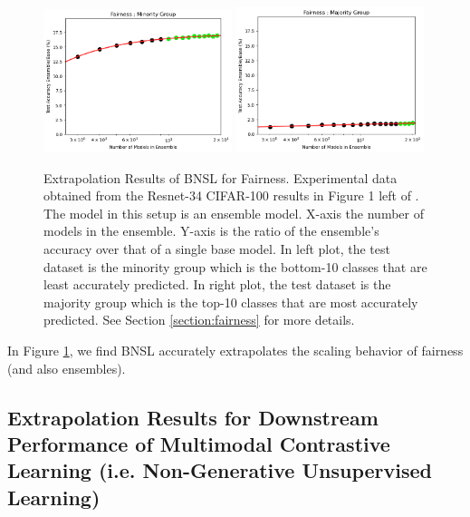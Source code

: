 \documentclass{article} %
\begin{document}
\begin{figure}[htbp]
    \centering
\includegraphics[width=0.49\textwidth]{figures/fairness/minority.png}
\includegraphics[width=0.49\textwidth]{figures/fairness/majority.png}
    \caption{
Extrapolation Results of BNSL for Fairness. Experimental data obtained from the Resnet-34 CIFAR-100 results in Figure 1 left of \cite{ko2023fair}. The model in this setup is an ensemble model. X-axis the number of models in the ensemble. Y-axis is the ratio of the ensemble's accuracy over that of a single base model. In left plot, the test dataset is the minority group which is the bottom-10 classes that are least accurately predicted. In right plot, the test dataset is the majority group which is the top-10 classes that are most accurately predicted. See Section \ref{section:fairness} for more details.
    }
    \label{fig:fairness}
\end{figure}

In Figure \ref{fig:fairness}, we find BNSL accurately extrapolates the scaling behavior of fairness (and also ensembles).

\clearpage



\clearpage

\subsection{Extrapolation Results for Downstream Performance of Multimodal Contrastive Learning (i.e. Non-Generative Unsupervised Learning)}
\label{section:extrapolate_contrastive}
\end{document}
